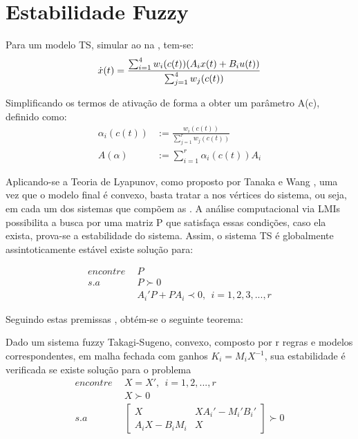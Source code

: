 \section{Estabilidade Fuzzy}
Para um modelo TS, simular ao na , tem-se:
\begin{align*}
	\dot{x}(t) = \frac{\sum_{i=1}^{4}  w_i(c(t))(A_i  x(t) +  B_i  u(t))}{\sum_{j=1}^{4} w_j(c(t))} \vspace{0.5cm}
\end{align*}

Simplificando os termos de ativação de forma a obter um parâmetro A(c), definido como:
\begin{align*}
	\alpha_i (c(t)) &:= \frac{w_i(c(t))}{\sum_{j=1}^{r}w_j(c(t))} \\
	A(\alpha) &:= \sum_{i=1}^{r} \alpha_i (c(t))A_i
\end{align*}

Aplicando-se a Teoria de Lyapunov, como proposto por Tanaka e Wang \cite{wang}, uma vez que o modelo final é convexo, basta tratar a  nos vértices do sistema, ou seja, em cada um dos sistemas que compõem as . 
A análise computacional via LMIs possibilita a busca por uma matriz P que satisfaça essas condições, caso ela exista, prova-se a estabilidade do sistema. Assim, o sistema TS é globalmente assintoticamente estável \cite{tanakaWang} existe solução para:

\begin{align} \label{eqLyapXk}
	encontre \ \ &P \nonumber \\
	s.a \ \ &P \succ 0 \nonumber \\
	&A_i'P + P A_i \prec 0, \ \ i=1,2,3, ... , r
\end{align}

Seguindo estas premissas \cite{wang}, obtém-se o seguinte teorema:
\begin{myteo} \label{teoControlador}
Dado um sistema fuzzy Takagi-Sugeno, convexo, composto por r regras e modelos correspondentes, em malha fechada com ganhos $K_i = M_i X^{-1}$, sua estabilidade é verificada se existe solução para o problema
	\begin{align} \label{eqContFuzzy}
		encontre \ \ &X = X', \ \ i = 1,2,...,r \nonumber \\
		&X \succ 0 \nonumber \\
		s.a \ \ & 
		\begin{bmatrix}
			X	&	XA_i' - M_i'B_i'  \\
			A_iX - B_iM_i &	X
		\end{bmatrix} \succ 0 \nonumber \\
	\end{align}
\end{myteo}

%

